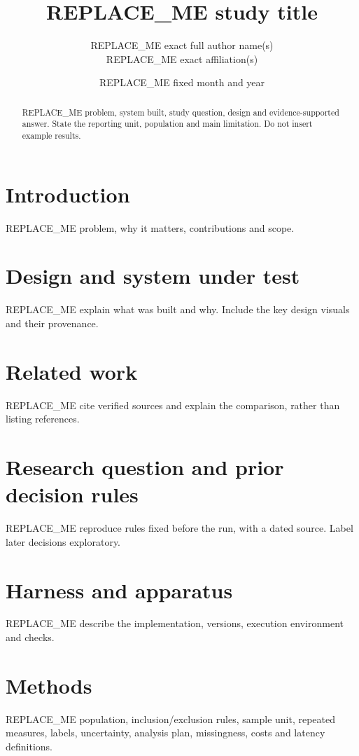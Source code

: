 \documentclass[11pt]{article}
\title{REPLACE_ME study title}
\author{REPLACE_ME exact full author name(s)\\[3pt]\normalsize REPLACE_ME exact affiliation(s)}
\date{REPLACE_ME fixed month and year}
\begin{document}
\maketitle

\begin{abstract}
REPLACE_ME problem, system built, study question, design and evidence-supported answer.
State the reporting unit, population and main limitation. Do not insert example results.
\end{abstract}

\section{Introduction}
REPLACE_ME problem, why it matters, contributions and scope.

\section{Design and system under test}
REPLACE_ME explain what was built and why. Include the key design visuals and their provenance.

\section{Related work}
REPLACE_ME cite verified sources and explain the comparison, rather than listing references.

\section{Research question and prior decision rules}
REPLACE_ME reproduce rules fixed before the run, with a dated source. Label later decisions exploratory.

\section{Harness and apparatus}
REPLACE_ME describe the implementation, versions, execution environment and checks.

\section{Methods}
REPLACE_ME population, inclusion/exclusion rules, sample unit, repeated measures, labels,
uncertainty, analysis plan, missingness, costs and latency definitions.
\end{document}
